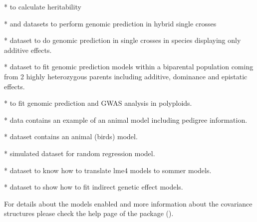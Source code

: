\documentclass[a4paper]{book}
\begin{document}
\begin{Details}
*  to calculate heritability

*  and  datasets to perform genomic prediction in hybrid single crosses 

*  dataset to do genomic prediction in single crosses in species displaying only additive effects.

*  dataset to fit genomic prediction models within a biparental population coming from 2 highly heterozygous parents including additive, dominance and epistatic effects. 

*  to fit genomic prediction and GWAS analysis in polyploids. 

*  data contains an example of an animal model including pedigree information.

*  dataset contains an animal (birds) model.

*  simulated dataset for random regression model.

*  dataset to know how to translate lme4 models to sommer models.

*  dataset to show how to fit indirect genetic effect models.


For details about the models enabled and more information about the covariance structures please check the help page of the package ().

\end{Details}
%
\end{document}
